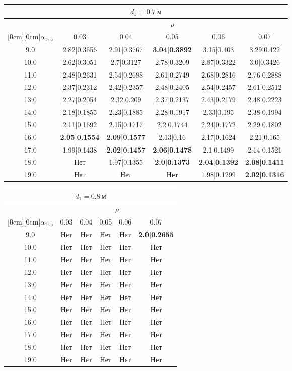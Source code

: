 \documentclass[20pt]{article}
\begin{document}
\begin{center}
\begin{tabular}{c|ccccc}
\hline
	\multicolumn{6}{c}{$d_{1}=0.7 \ м$} \\
\hline
	 & \multicolumn{5}{|c}{$\rho$} \\
	\cline{2-6}
	\raisebox{1.5ex}[0cm][0cm]{$\alpha_{1эф}$} & 0.03 & 0.04 & 0.05 & 0.06 & 0.07\\
\hline
	9.0 & 	2.82|0.3656 & 	2.91|0.3767 & 	\textbf{3.04|0.3892} & 	3.15|0.403 & 	3.29|0.422\\
	10.0 & 	2.62|0.3051 & 	2.7|0.3127 & 	2.78|0.3209 & 	2.87|0.3322 & 	3.0|0.3426\\
	11.0 & 	2.48|0.2631 & 	2.54|0.2688 & 	2.61|0.2749 & 	2.68|0.2816 & 	2.76|0.2888\\
	12.0 & 	2.37|0.2312 & 	2.42|0.2357 & 	2.48|0.2405 & 	2.54|0.2457 & 	2.61|0.2512\\
	13.0 & 	2.27|0.2054 & 	2.32|0.209 & 	2.37|0.2137 & 	2.43|0.2179 & 	2.48|0.2223\\
	14.0 & 	2.18|0.1855 & 	2.23|0.1885 & 	2.28|0.1917 & 	2.33|0.195 & 	2.38|0.1994\\
	15.0 & 	2.11|0.1692 & 	2.15|0.1717 & 	2.2|0.1744 & 	2.24|0.1772 & 	2.29|0.1802\\
	16.0 & 	\textbf{2.05|0.1554} & 	\textbf{2.09|0.1577} & 	2.13|0.16 & 	2.17|0.1624 & 	2.21|0.165\\
	17.0 & 	1.99|0.1438 & 	\textbf{2.02|0.1457} & 	\textbf{2.06|0.1478} & 	2.1|0.1499 & 	2.14|0.1521\\
	18.0 & 	Нет & 	1.97|0.1355 & 	\textbf{2.0|0.1373} & 	\textbf{2.04|0.1392} & 	\textbf{2.08|0.1411}\\
	19.0 & 	Нет & 	Нет & 	Нет & 	1.98|0.1299 & 	\textbf{2.02|0.1316}\\
\end{tabular}

\begin{tabular}{c|ccccc}
\hline
	\multicolumn{6}{c}{$d_{1}=0.8 \ м$} \\
\hline
	 & \multicolumn{5}{|c}{$\rho$} \\
	\cline{2-6}
	\raisebox{1.5ex}[0cm][0cm]{$\alpha_{1эф}$} & 0.03 & 0.04 & 0.05 & 0.06 & 0.07\\
\hline
	9.0 & 	Нет & 	Нет & 	Нет & 	Нет & 	\textbf{2.0|0.2655}\\
	10.0 & 	Нет & 	Нет & 	Нет & 	Нет & 	Нет\\
	11.0 & 	Нет & 	Нет & 	Нет & 	Нет & 	Нет\\
	12.0 & 	Нет & 	Нет & 	Нет & 	Нет & 	Нет\\
	13.0 & 	Нет & 	Нет & 	Нет & 	Нет & 	Нет\\
	14.0 & 	Нет & 	Нет & 	Нет & 	Нет & 	Нет\\
	15.0 & 	Нет & 	Нет & 	Нет & 	Нет & 	Нет\\
	16.0 & 	Нет & 	Нет & 	Нет & 	Нет & 	Нет\\
	17.0 & 	Нет & 	Нет & 	Нет & 	Нет & 	Нет\\
	18.0 & 	Нет & 	Нет & 	Нет & 	Нет & 	Нет\\
	19.0 & 	Нет & 	Нет & 	Нет & 	Нет & 	Нет\\
\end{tabular}

\end{center}
\end{document}
